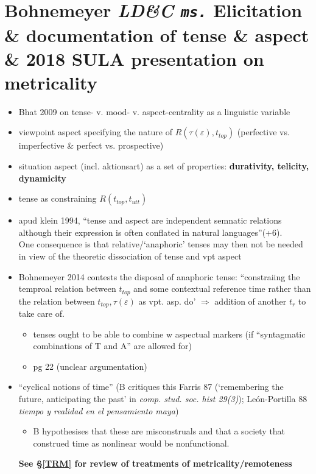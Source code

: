 \documentclass[10pt]{article}
\begin{document}
\section{Bohnemeyer \textit{LD\&C \texttt{ms.}} Elicitation \& documentation of tense \& aspect \& 2018 SULA presentation on metricality}
\begin{itemize}
	\item Bhat 2009 on tense- v. mood- v. aspect-centrality as a linguistic variable
	\item viewpoint aspect specifying the nature of $R(\tau(\varepsilon),t_\textit{top})$ (perfective vs. imperfective \& perfect vs. prospective)
	\item situation aspect (incl. aktionsart) as a set of properties: \textbf{durativity, telicity, dynamicity}
	\item tense as constraining $R(t_\textit{top}, t_\textit{utt})$
	\item apud klein 1994, ``tense and aspect are independent semnatic relations although their expression is often conflated in natural languages''(+6).\\
	One consequence is that relative/`anaphoric' tenses may then not be needed in view of the theoretic dissociation of tense and vpt aspect
	\item Bohnemeyer 2014 contests the disposal of anaphoric tense: ``constraiing the temproal relation between $t_\textit{top}$ and some contextual reference time rather than the relation between $t_\textit{top},\tau(\varepsilon)$ as vpt. asp. do' $\Rightarrow$ addition of another $t_{r}$ to take care of.
		\begin{itemize}
			\item tenses ought to be able to combine w aspectual markers (if ``syntagmatic combinations of T and A'' are allowed for)
			\item pg 22 (unclear argumentation)
		\end{itemize}
	\item ``cyclical notions of time'' (B critiques this Farris 87 (`remembering the future, anticipating the past' in \textit{comp. stud. soc. hist 29(3)}); León-Portilla 88 \textit{tiempo y realidad en el pensamiento maya})
	\begin{itemize}
		\item B hypothesises that these are misconstruals and that a society that construed time as nonlinear would be nonfunctional.
	\end{itemize}
\textbf{See §\ref{TRM} for review of treatments of metricality/remoteness}


	\end{itemize}
\end{document}
